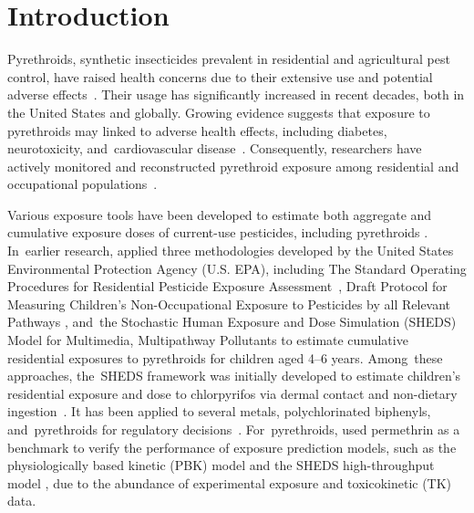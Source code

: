 \documentclass[toxics,article,accept,pdftex,moreauthors]{Definitions/mdpi}
\begin{document}
\section{Introduction}\label{introduction}

Pyrethroids, synthetic insecticides prevalent in residential and agricultural
pest control, have raised health concerns due to their extensive use and
potential adverse effects~\citep{burns2018pyrethroid}. Their usage has
significantly increased in recent decades, both in the United States and
globally. Growing evidence suggests that exposure to pyrethroids may linked to
adverse health effects, including diabetes, neurotoxicity, and~cardiovascular
disease~\citep{park2019environmental, bao2020association,
kim2021environmental}. Consequently, researchers have actively
monitored and reconstructed pyrethroid exposure among residential and
occupational populations~\citep{zartarian2012quantifying,
bravo2022occupational}.

Various exposure tools have been developed to estimate both aggregate
and cumulative exposure doses of current-use pesticides, including
pyrethroids
\citep{tulve2011methodologies, zartarian2012quantifying, xue2014epa}. In~earlier research, \citet{tulve2011methodologies} applied three methodologies
developed by the United States Environmental Protection Agency (U.S. EPA),
including The Standard Operating Procedures for Residential Pesticide Exposure
Assessment~\citep{us2012standard}, Draft Protocol for Measuring Children's
Non-Occupational Exposure to Pesticides by all Relevant Pathways
\citep{us2001draft}, and~the Stochastic Human Exposure and Dose Simulation
(SHEDS) Model for Multimedia, Multipathway Pollutants to estimate cumulative
residential exposures to pyrethroids for children aged 4--6 years. Among~these
approaches, the~SHEDS framework was initially developed to estimate children's
residential exposure and dose to chlorpyrifos via dermal contact and
non-dietary ingestion~\citep{zartarian2000modeling}. It has been applied to
several metals, polychlorinated biphenyls, and~pyrethroids for regulatory
decisions~\citep{tulve2011methodologies, xue2015modeling,
zartarian2017children}. For~pyrethroids, \citet{zartarian2012quantifying} used
permethrin as a benchmark to verify the performance of exposure prediction
models, such as the physiologically based kinetic (PBK) model
\citep{tornero2012pharmacokinetic} and the SHEDS high-throughput model
\citep{isaacs2014sheds}, due to the abundance of experimental exposure and
toxicokinetic (TK) data.
\end{document}
